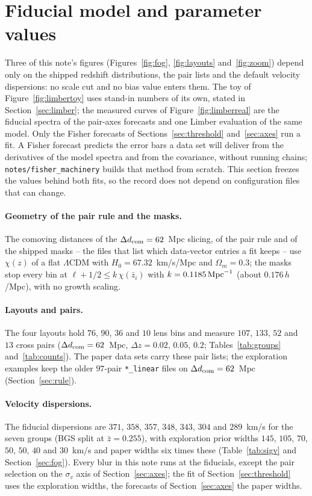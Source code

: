\documentclass[11pt]{article}
\newcommand{\dcom}{$\Delta d_{\rm com} = 62$~Mpc}
\newcommand{\sv}{\sigma_v}
\newcommand{\us}{\_\allowbreak}
\begin{document}
\section{Fiducial model and parameter values}
\label{sec:fiducial}

Three of this note's figures (Figures~\ref{fig:fog},
\ref{fig:layouts} and~\ref{fig:zoom}) depend only on the shipped
redshift distributions, the pair lists and the default velocity
dispersions: no scale cut and no bias value enters them.  The toy of
Figure~\ref{fig:limbertoy} uses stand-in numbers of its own, stated
in Section~\ref{sec:limber}; the measured curves of
Figure~\ref{fig:limberreal} are the fiducial spectra of the
pair-axes forecasts and one Limber evaluation of the same model.
Only the
Fisher forecasts of Sections~\ref{sec:threshold} and~\ref{sec:axes}
run a fit.  A Fisher forecast predicts the error bars a data set will
deliver from the derivatives of the model spectra and from the
covariance, without running chains;
\texttt{notes/fisher\us machinery} builds that method from scratch.
This section freezes the values behind both fits, so the record
does not depend on configuration files that can change.

\paragraph{Geometry of the pair rule and the masks.}
The comoving distances of the \dcom{} slicing, of the pair rule and of
the shipped masks -- the files that list which data-vector entries a
fit keeps -- use $\chi(z)$ of a flat $\Lambda$CDM with
$H_0 = 67.32$~km/s/Mpc and $\Omega_m = 0.3$; the masks stop every bin
at $\ell + 1/2 \le k\,\chi(\bar{z}_i)$ with
$k = 0.1185\,{\rm Mpc}^{-1}$ (about $0.176\,h$/Mpc), with no growth
scaling.

\paragraph{Layouts and pairs.}
The four layouts hold $76$, $90$, $36$ and $10$ lens bins and measure
$107$, $133$, $52$ and $13$ cross pairs (\dcom{},
$\Delta z = 0.02$, $0.05$, $0.2$; Tables~\ref{tab:groups}
and~\ref{tab:counts}).  The paper data sets carry these pair lists;
the exploration examples keep the older $97$-pair \texttt{*\us linear}
files on \dcom{} (Section~\ref{sec:rule}).

\paragraph{Velocity dispersions.}
The fiducial dispersions are $371$, $358$, $357$, $348$, $343$, $304$
and $289$~km/s for the seven groups (BGS split at $\bar{z} = 0.255$),
with exploration prior widths $145$, $105$, $70$, $50$, $50$, $40$ and
$30$~km/s and paper widths six times these (Table~\ref{tab:sigv} and
Section~\ref{sec:fog}).  Every blur in this note runs at the
fiducials, except the pair selection on the $\sv$ axis of
Section~\ref{sec:axes}; the fit of Section~\ref{sec:threshold} uses
the exploration widths, the forecasts of Section~\ref{sec:axes} the
paper widths.
\end{document}
